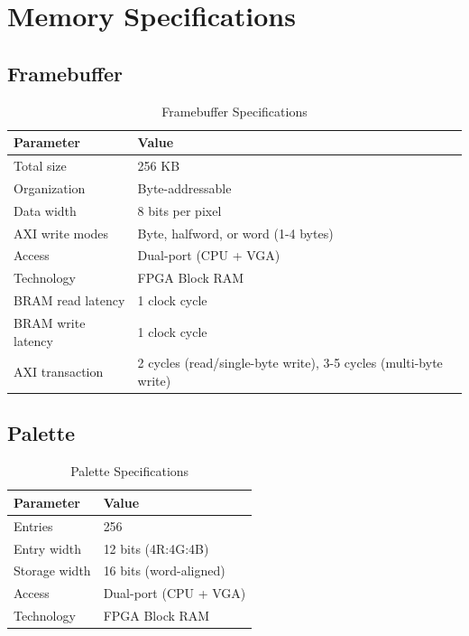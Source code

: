 \documentclass[11pt,letterpaper]{report}
\begin{document}
\section{Memory Specifications}

\subsection{Framebuffer}

\begin{table}[tbp]
\centering
\caption{Framebuffer Specifications}
\label{tab:fb_specs}
\begin{tabular}{ll}
\toprule
\textbf{Parameter} & \textbf{Value} \\
\midrule
Total size & 256 KB \\
Organization & Byte-addressable \\
Data width & 8 bits per pixel \\
AXI write modes & Byte, halfword, or word (1-4 bytes) \\
Access & Dual-port (CPU + VGA) \\
Technology & FPGA Block RAM \\
BRAM read latency & 1 clock cycle \\
BRAM write latency & 1 clock cycle \\
AXI transaction & 2 cycles (read/single-byte write), 3-5 cycles (multi-byte write) \\
\bottomrule
\end{tabular}
\end{table}

\subsection{Palette}

\begin{table}[tbp]
\centering
\caption{Palette Specifications}
\label{tab:pal_specs}
\begin{tabular}{ll}
\toprule
\textbf{Parameter} & \textbf{Value} \\
\midrule
Entries & 256 \\
Entry width & 12 bits (4R:4G:4B) \\
Storage width & 16 bits (word-aligned) \\
Access & Dual-port (CPU + VGA) \\
Technology & FPGA Block RAM \\
\bottomrule
\end{tabular}
\end{table}
\end{document}
